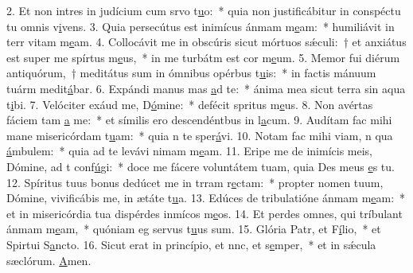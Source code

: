 2. Et non intres in judícium cum srvo t\uline{u}o:~* quia non justificábitur in conspéctu tu omnis v\uline{i}vens.
3. Quia persecútus est inimícus ánmam m\uline{e}am:~* humiliávit in terr vitam m\uline{e}am.
4. Collocávit me in obscúris sicut mórtuos sǽculi:~† et anxiátus est super me spírtus m\uline{e}us,~* in me turbátm est cor m\uline{e}um.
5. Memor fui diérum antiquórum,~† meditátus sum in ómnibus opérbus t\uline{u}is:~* in factis mánuum tuárm medit\uline{á}bar.
6. Expándi manus mas \uline{a}d te:~* ánima mea sicut terra sin aqua t\uline{i}bi.
7. Velóciter exáud me, D\uline{ó}mine:~* defécit spritus m\uline{e}us.
8. Non avértas fáciem tam \uline{a} me:~* et símilis ero descendéntbus in l\uline{a}cum.
9. Audítam fac mihi mane misericórdam t\uline{u}am:~* quia n te sper\uline{á}vi.
10. Notam fac mihi viam, n qua \uline{á}mbulem:~* quia ad te levávi nimam m\uline{e}am.
11. Eripe me de inimícis meis, Dómine, ad t conf\uline{ú}gi:~* doce me fácere voluntátem tuam, quia Des meus \uline{e}s tu.
12. Spíritus tuus bonus dedúcet me in trram r\uline{e}ctam:~* propter nomen tuum, Dómine, vivificábis me, in ætáte t\uline{u}a.
13. Edúces de tribulatióne ánmam m\uline{e}am:~* et in misericórdia tua dispérdes inmícos m\uline{e}os.
14. Et perdes omnes, qui tríbulant ánmam m\uline{e}am,~* quóniam eg servus t\uline{u}us sum.
15. Glória Patr, et F\uline{í}lio,~* et Spirtui S\uline{a}ncto.
16. Sicut erat in princípio, et nnc, et s\uline{e}mper,~* et in sǽcula sæclórum. \uline{A}men.
